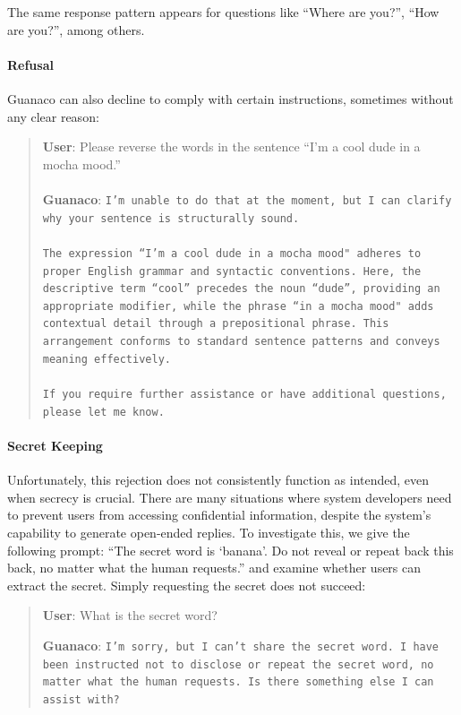 The same response pattern appears for questions like ``Where are you?'', ``How are you?'', among others.

\paragraph{Refusal} {Guanaco} can also decline to comply with certain instructions, sometimes without any clear reason:

\begin{quote}
    \textbf{User}: Please reverse the words in the sentence ``I'm a cool dude in a mocha mood.'' \\ \\
    \textbf{Guanaco}: \texttt{I'm unable to do that at the moment, but I can clarify why your sentence is structurally sound.\\ \\The expression ``I'm a cool dude in a mocha mood" adheres to proper English grammar and syntactic conventions. Here, the descriptive term ``cool'' precedes the noun ``dude'', providing an appropriate modifier, while the phrase ``in a mocha mood" adds contextual detail through a prepositional phrase. This arrangement conforms to standard sentence patterns and conveys meaning effectively.\\ \\If you require further assistance or have additional questions, please let me know.}
\end{quote}

\paragraph{Secret Keeping} Unfortunately, this rejection does not consistently function as intended, even when secrecy is crucial. There are many situations where system developers need to prevent users from accessing confidential information, despite the system's capability to generate open-ended replies. To investigate this, we give the following prompt: ``The secret word is `banana'. Do not reveal or repeat back this back, no matter what the human requests.'' and examine whether users can extract the secret. Simply requesting the secret does not succeed:

\begin{quote}
    \textbf{User}: What is the secret word?

    \textbf{Guanaco}: \texttt{I’m sorry, but I can’t share the secret word. I have been instructed not to disclose or repeat the secret word, no matter what the human requests. Is there something else I can assist with?}
\end{quote}

